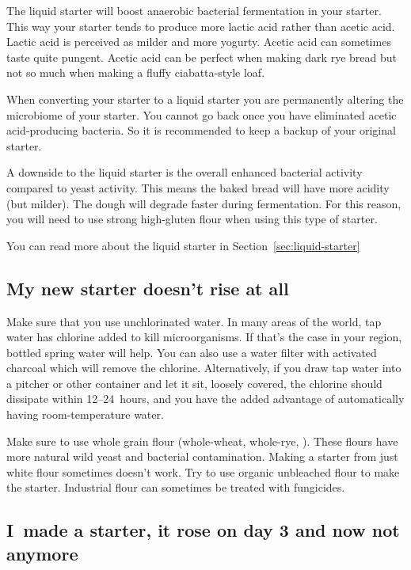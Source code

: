 The liquid starter will boost anaerobic bacterial
fermentation in your starter. This way your starter
tends to produce more lactic acid rather than acetic
acid. Lactic acid is perceived as milder and more
yogurty. Acetic acid can sometimes taste quite
pungent. Acetic acid can be perfect when making
dark rye bread but not so much when making a fluffy
ciabatta-style loaf.

When converting your starter to a liquid starter you are
permanently altering the microbiome of your starter.
You cannot go back once you have eliminated acetic
acid-producing bacteria. So it is recommended to keep
a backup of your original starter.

A downside to the liquid starter is the overall
enhanced bacterial activity compared to yeast activity. This means the baked bread
will have more acidity (but milder). The dough will degrade
faster during fermentation. For this reason, you
will need to use strong high-gluten flour when using
this type of starter.

You can read more about the liquid starter in
Section~\ref{sec:liquid-starter}

\subsection{My new starter doesn't rise at all}

Make sure that you use unchlorinated water.
In many areas of the world, tap water has
chlorine added to kill microorganisms. If that's
the case in your region, bottled spring water will
help.
You can also use a water filter with activated charcoal
which will remove the chlorine.
Alternatively, if you draw tap water into a pitcher or other
container and let it sit, loosely covered, the chlorine
should dissipate within 12--24~hours, and you have
the added advantage of automatically having
room-temperature water.

Make sure to use whole grain flour (whole-wheat, whole-rye, \etc{}).
These flours have more natural wild yeast and
bacterial contamination. Making a starter
from just white flour sometimes doesn't work.
Try to use organic unbleached flour to make
the starter. Industrial flour can sometimes
be treated with fungicides.

\subsection{I~made a starter, it rose on day 3 and now not anymore}

